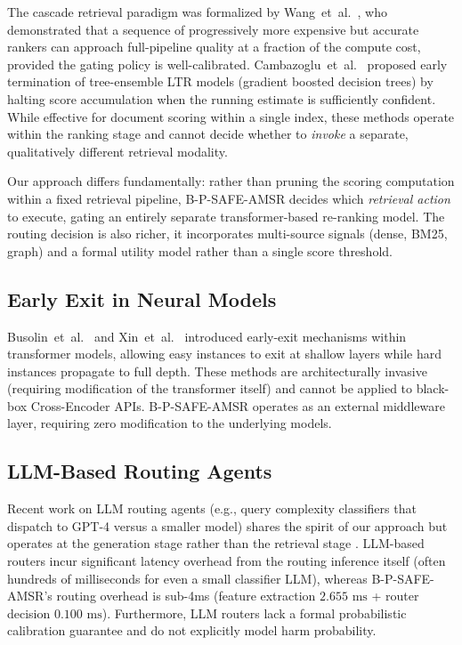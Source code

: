 \documentclass[journal]{IEEEtran}
\begin{document}
The cascade retrieval paradigm was formalized by Wang~et~al.\
\cite{wang2011cascade}, who demonstrated that a sequence of
progressively more expensive but accurate rankers can approach
full-pipeline quality at a fraction of the compute cost, provided
the gating policy is well-calibrated. Cambazoglu~et~al.\
\cite{cambazoglu2010earlyterm} proposed early termination of
tree-ensemble LTR models (gradient boosted decision trees) by
halting score accumulation when the running estimate is
sufficiently confident. While effective for document scoring within
a single index, these methods operate within the ranking stage and
cannot decide whether to \emph{invoke} a separate, qualitatively
different retrieval modality.

Our approach differs fundamentally: rather than pruning the scoring
computation within a fixed retrieval pipeline, B-P-SAFE-AMSR
decides which \emph{retrieval action} to execute, gating an entirely
separate transformer-based re-ranking model. The routing decision
is also richer, it incorporates multi-source signals (dense, BM25,
graph) and a formal utility model rather than a single score
threshold.

\subsection{Early Exit in Neural Models}

Busolin~et~al.~\cite{busolin2022earlyexit} and Xin~et~al.\
\cite{xin2020berxit} introduced early-exit mechanisms within
transformer models, allowing easy instances to exit at shallow
layers while hard instances propagate to full depth. These
methods are architecturally invasive (requiring modification of
the transformer itself) and cannot be applied to black-box
Cross-Encoder APIs. B-P-SAFE-AMSR operates as an external
middleware layer, requiring zero modification to the underlying
models.

\subsection{LLM-Based Routing Agents}

Recent work on LLM routing agents (e.g., query complexity
classifiers that dispatch to GPT-4 versus a smaller model)
shares the spirit of our approach but operates at the generation
stage rather than the retrieval stage \cite{chen2023frugalgpt}.
LLM-based routers incur significant latency overhead from the
routing inference itself (often hundreds of milliseconds for
even a small classifier LLM), whereas B-P-SAFE-AMSR's routing
overhead is sub-4ms (feature extraction $2.655\text{ ms}$ +
router decision $0.100\text{ ms}$). Furthermore, LLM routers
lack a formal probabilistic calibration guarantee and do not
explicitly model harm probability.
\end{document}
